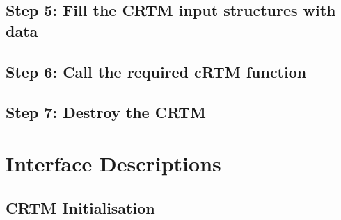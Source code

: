 \subsection{Step 5: Fill the CRTM input structures with data}

\subsection{Step 6: Call the required cRTM function}

\subsection{Step 7: Destroy the CRTM}


\section{Interface Descriptions}

\subsection{CRTM Initialisation}

